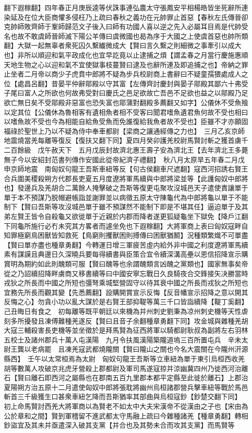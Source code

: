 翻下遐稼翻】四年春正月庚辰逵等伏誅事連弘農太守張鳳安平相楊皓皆坐死辭所連染延及在位大臣商懼多侵枉乃上疏曰春秋之義功在元帥罪止首惡【春秋左氏傳晉卻克帥師敗齊師于鞌師歸范文子後入曰師有功國人喜以逆之先入必屬耳目焉是代帥受名也故不敢虞師晉師滅下陽公羊傳曰虞微國也曷為序于大國之上使虞首惡也帥所類翻】大獄一起無辜者衆死囚久繫纎微成大【賢曰言久繫之則細微之事牽引以成大也】非所以順迎和氣平政成化也宜早訖竟以止逮捕之煩【謂孟春之月當行慶施惠順天地生物之心以迎和氣不宜使獄事枝蔓賢曰逮及也辭所連及即追捕之也】帝納之罪止坐者二月帝以商少子虎賁中郎將不疑為步兵校尉商上書辭曰不疑童孺猥處成人之位【處昌呂翻】昔晏平仲辭鄁殿以守其富【左傳齊討慶封與晏子鄁殿其鄙六十弗受子尾曰富人之所欲也何故弗受對曰慶氏之邑足欲故亡吾邑不足欲也益之以鄁殿乃足欲亡無日矣不受鄁殿非惡富也恐失富也鄁蒲對翻殿多薦翻又如字】公儀休不受魚飱以定其位【公儀休為魯相客有遺相魚者相不受客曰聞君嗜魚遺君魚何故不受也相曰以嗜魚故不受也今為相能自給魚受魚而免誰復給我魚者故不受也】臣雖不才亦願固福祿於聖世上乃以不疑為侍中奉車都尉【梁商之讓通經傳之力也】　三月乙亥京師地震燒當羌每離等復反【復扶又翻下同】夏四月癸卯護羌校尉馬賢討斬之獲首虜千二百餘級　戊午赦天下　五月戊辰封故濟北惠王壽子安為濟北王【去年濟北王多薨無子今以安紹封范書列傳作安國此從帝紀濟子禮翻】　秋八月太原旱五年春二月戊申京師地震　南匈奴句龍王吾斯車紐等反【句古侯翻車尺遮翻】寇西河招誘右賢王合兵圍美稷殺朔方代郡長吏夏五月度遼將軍馬續與中郎將梁並等【此護匈奴中郎將也】發邊兵及羌胡合二萬餘人掩擊破之吾斯等復更屯聚攻沒城邑天子遣使責讓單于單于本不預謀乃脱帽避帳詣並謝罪並以病徵五原太守陳龜代為中郎將龜以單于不能制下【賢曰吾斯等攻沒城邑單于雖不預謀然不能制下即是不堪其任】逼迫單于及其弟左賢王皆令自殺龜又欲徙單于近親於内郡而降者遂更狐疑龜坐下獄免【降戶江翻下同龜所施行必冇未究其方畧者而遽坐免也下遐稼翻】大將軍商上表曰匈奴寇畔自知罪極窮鳥困獸皆知救死【鳥窮則攫獸困則搏傳曰困獸猶鬭】況種類繁熾不可單盡【賢曰單亦盡也種章勇翻】今轉運日增三軍疲苦虛内給外非中國之利度遼將軍馬續素有謀謨且典邊日久深曉兵要每得續書與臣策合宜令續深溝高壘以恩信招降宣示購賞明為期約如此則醜類可服【賢曰醜等也余謂醜類言凶醜之黨類也】國家無事矣帝從之乃詔續招降畔虜商又移書續等曰中國安寧忘戰日久良騎夜合交鋒接矢决勝當時戎狄之所長而中國之所短也彊弩乘城堅營固守以待其衰中國之所長而戎狄之所短也宜務先所長而觀其變【先悉薦翻】設購開賞宣示反悔【反音幡宣示招降之意以開其反悔之心】勿貪小功以亂大謀於是右賢王部抑鞮等萬三千口皆詣續降【鞮丁奚翻】　己丑晦日有食之　初每離等既平朝廷以來機為并州刺史劉秉為凉州刺史機等天性虐刻多所擾發且凍傅難種羌遂反【賢曰且音子余翻種章勇翻下同】攻金城與雜種羌胡大寇三輔殺害長吏機等並坐徵於是拜馬賢為征西將軍以騎都尉耿叔為副將左右羽林五校士及諸州郡兵十萬人屯漢陽　九月令扶風漢陽築隴道塢三百所置屯兵　辛未太尉王龔以老病罷　且凍羌寇武都燒隴關【賢曰隴山之關也今名大震關在今隴州汧源縣西】　壬午以太常桓焉為太尉　匈奴句龍王吾斯等立車紐為單于東引烏桓西收羌胡等數萬人攻破京兆虎牙營殺上郡都尉及軍司馬遂寇掠并涼幽冀四州乃徙西河治離石【賢曰離石即西河之屬縣也在郡南五百九里郡本都平定縣至此徙於離石】上郡治夏陽朔方治五原十二月遣使匈奴中郎將張耽將幽州烏桓諸郡營兵擊車紐等戰於馬邑斬首三千級獲生口甚衆車紐乞降而吾斯猶率其部曲與烏桓寇鈔【鈔楚交翻下同】　初上命馬賢討西羌大將軍商以為賢老不如太中大夫宋漢帝不從漢由之子也【宋由為公於章和之間】賢到軍稽留不進武都太守馬融上疏曰今雜種諸羌【種章勇翻】轉相鈔盜宜及其未并亟遣深入破其支黨【并合也及其勢未合而攻其支黨】而馬賢等